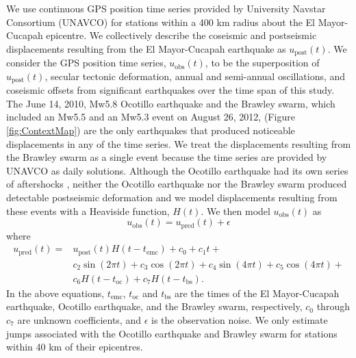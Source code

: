 \documentclass[review]{elsarticle}
\begin{document}
We use continuous GPS position time series provided by University Navstar Consortium (UNAVCO) for stations within a 400 km radius about the El Mayor-Cucapah epicentre. We collectively describe the coseismic and postseismic displacements resulting from the El Mayor-Cucapah earthquake as $u_\mathrm{post}(t)$.  We consider the GPS position time series, $u_\mathrm{obs}(t)$, to be the superposition of $u_\mathrm{post}(t)$, secular tectonic deformation, annual and semi-annual oscillations, and coseismic offsets from significant earthquakes over the time span of this study.  The June 14, 2010, Mw5.8 Ocotillo earthquake and the Brawley swarm, which included an Mw5.5 and an Mw5.3 event on August 26, 2012, (Figure \ref{fig:ContextMap}) are the only earthquakes that produced noticeable displacements in any of the time series.  We treat the displacements resulting from the Brawley swarm as a single event because the time series are provided by UNAVCO as daily solutions. Although the Ocotillo earthquake had its own series of aftershocks \citep{Hauksson2011}, neither the Ocotillo earthquake nor the Brawley swarm produced detectable postseismic deformation and we model displacements resulting from these events with a Heaviside function, $H(t)$.  We then model $u_\mathrm{obs}(t)$ as 
\begin{equation}
  u_\mathrm{obs}(t) = u_\mathrm{pred}(t) + \epsilon
\end{equation}
where
\begin{equation}\label{TimeSeriesModel}
  \begin{split}  
    u_\mathrm{pred}(t) = &u_\mathrm{post}(t)H(t-t_\mathrm{emc}) + c_0 + c_1t + \\
                         &c_2\sin(2\pi t) + c_3\cos(2\pi t) + c_4\sin(4\pi t) + c_5\cos(4\pi t) + \\
                         &c_6H(t-t_\mathrm{oc}) + c_7H(t-t_\mathrm{bs}).
  \end{split}
\end{equation}
In the above equations, $t_\mathrm{emc}$, $t_\mathrm{oc}$ and $t_\mathrm{bs}$ are the times of the El Mayor-Cucapah earthquake, Ocotillo earthquake, and the Brawley swarm, respectively, $c_0$ through $c_7$ are unknown coefficients, and $\epsilon$ is the observation noise. We only estimate jumps associated with the Ocotillo earthquake and Brawley swarm for stations within 40 km of their epicentres. 
\end{document}
